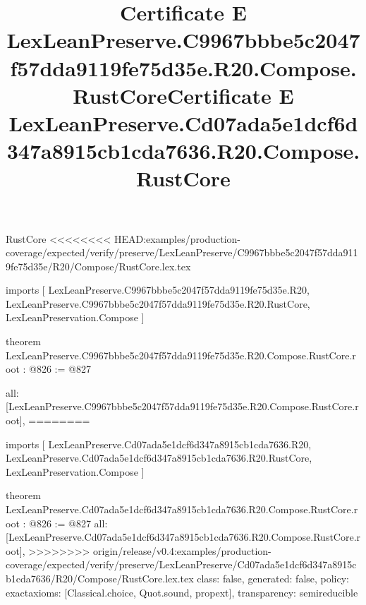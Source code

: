 \begin{lexlean}{RustCore}
<<<<<<<< HEAD:examples/production-coverage/expected/verify/preserve/LexLeanPreserve/C9967bbbe5c2047f57dda9119fe75d35e/R20/Compose/RustCore.lex.tex
\title{Certificate E LexLeanPreserve.C9967bbbe5c2047f57dda9119fe75d35e.R20.Compose.RustCore}
\begin{coremodule}
imports [
  LexLeanPreserve.C9967bbbe5c2047f57dda9119fe75d35e.R20,
  LexLeanPreserve.C9967bbbe5c2047f57dda9119fe75d35e.R20.RustCore,
  LexLeanPreservation.Compose
]

theorem LexLeanPreserve.C9967bbbe5c2047f57dda9119fe75d35e.R20.Compose.RustCore.root : @826 := @827 {
  all: [LexLeanPreserve.C9967bbbe5c2047f57dda9119fe75d35e.R20.Compose.RustCore.root],
========
\title{Certificate E LexLeanPreserve.Cd07ada5e1dcf6d347a8915cb1cda7636.R20.Compose.RustCore}
\begin{coremodule}
imports [
  LexLeanPreserve.Cd07ada5e1dcf6d347a8915cb1cda7636.R20,
  LexLeanPreserve.Cd07ada5e1dcf6d347a8915cb1cda7636.R20.RustCore,
  LexLeanPreservation.Compose
]

theorem LexLeanPreserve.Cd07ada5e1dcf6d347a8915cb1cda7636.R20.Compose.RustCore.root : @826 := @827 {
  all: [LexLeanPreserve.Cd07ada5e1dcf6d347a8915cb1cda7636.R20.Compose.RustCore.root],
>>>>>>>> origin/release/v0.4:examples/production-coverage/expected/verify/preserve/LexLeanPreserve/Cd07ada5e1dcf6d347a8915cb1cda7636/R20/Compose/RustCore.lex.tex
  class: false,
  generated: false,
  policy: exact{axioms: [Classical.choice, Quot.sound, propext]},
  transparency: semireducible
}


\end{coremodule}}
\end{coremodule}
\end{lexlean}
